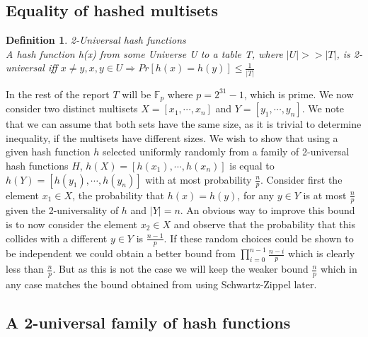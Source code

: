 \documentclass[article,a4paper,oneside]{article}
\newtheorem{definition}{Definition}
\newcommand{\+}[1]{\ensuremath{\boldsymbol{#1}}}
\begin{document}
\subsection*{Equality of hashed multisets}
\begin{definition}{2-Universal hash functions}\\
A hash function h(x) from some Universe \emph{U} to a table {T}, where $|U| >> |T|$, is 2\emph{-}universal iff $x \neq y, x,y \in U \Rightarrow Pr[h(x) = h(y)] \leq \frac{1}{|T|}$
\end{definition}
In the rest of the report $T$ will be $\mathbb{F}_p$ where $p = 2^{31} - 1$, which is prime.
We now consider two distinct multisets $X = \left[x_1,\cdots, x_n\right]$ and $Y = \left[y_1, \cdots, y_n\right]$. We note that we can assume that both sets have the same size, as it is trivial to determine inequality, if the multisets have different sizes.
We wish to show that using a given hash function $h$ selected uniformly randomly from a family of 2-universal hash functions $H$, $h(X) = \left[h(x_1),\cdots, h(x_n)\right]$ is equal to $h(Y) = \left[h(y_1),\cdots,h(y_n)\right]$ with at most probability $\frac{n}{p}$.
Consider first the element $x_1 \in X$, the probability that $h(x) = h(y)$, for any $y \in Y$ is at most $\frac{n}{p}$ given the 2-universality of $h$ and $|Y| = n$.
An obvious way to improve this bound is to now consider the element $x_2 \in X$ and observe that the probability that this collides with a different $y \in Y$ is $\frac{n-1}{p}$. If these random choices could be shown to be independent we could obtain a better bound from $\prod_{i=0}^{n-1}\frac{n-i}{p}$ which is clearly less than $\frac{n}{p}$. But as this is not the case we will keep the weaker bound $\frac{n}{p}$ which in any case matches the bound obtained from using Schwartz-Zippel later.
\subsection*{A 2-universal family of hash functions}
\end{document}
